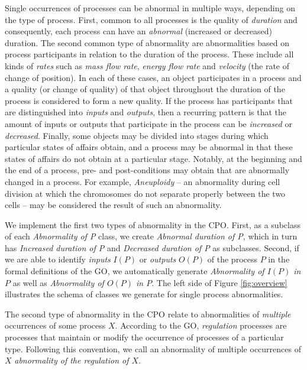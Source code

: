 \documentclass{bioinfo}
\begin{document}
Single occurrences of processes can be abnormal in multiple ways,
depending on the type of process.
%
First, common to all processes is the quality of {\em duration} and
consequently, each process can have an {\em abnormal} (increased or
decreased) duration. The second common type of abnormality are
abnormalities based on process participants in relation to the
duration of the process. These include all kinds of {\em rates} such
as {\em mass flow rate}, {\em energy flow rate} and {\em velocity}
(the rate of change of position). In each of these cases, an object
participates in a process and a quality (or change of quality) of that
object throughout the duration of the process is considered to form a
new quality. If the process has participants that are distinguished
into {\em inputs} and {\em outputs}, then a recurring pattern is that
the amount of inputs or outputs that participate in the process can be
{\em increased} or {\em decreased}.  Finally, some objects may be
divided into stages during which particular states of affairs obtain,
and a process may be abnormal in that these states of affairs do not
obtain at a particular stage. Notably, at the beginning and the end of
a process, pre- and post-conditions may obtain that are abnormally
changed in a process. For example, {\em Aneuploidy} -- an abnormality
during cell division at which the chromosomes do not separate properly
between the two cells -- may be considered the result of such an
abnormality.

We implement the first two types of abnormality in the CPO. First, as
a subclass of each {\em Abnormality of P} class, we create {\em
  Abnormal duration of P}, which in turn has {\em Increased duration
  of P} and {\em Decreased duration of P} as subclasses. Second, if we
are able to identify {\em inputs} $I(P)$ or {\em outputs} $O(P)$ of
the process $P$ in the formal definitions of the GO, we automatically
generate {\em Abnormality of $I(P)$ in $P$} as well as {\em
  Abnormality of $O(P)$ in $P$}.  The left side of Figure
\ref{fig:overview} illustrates the schema of classes we generate for
single process abnormalities.

The second type of abnormality in the CPO relate to abnormalities of
{\em multiple} occurrences of some process $X$. According to the GO,
{\em regulation} processes are processes that maintain or modify the
occurrence of processes of a particular type. Following this
convention, we call an abnormality of multiple occurrences of $X$ {\em
  abnormality of the regulation of $X$}.
\end{document}
